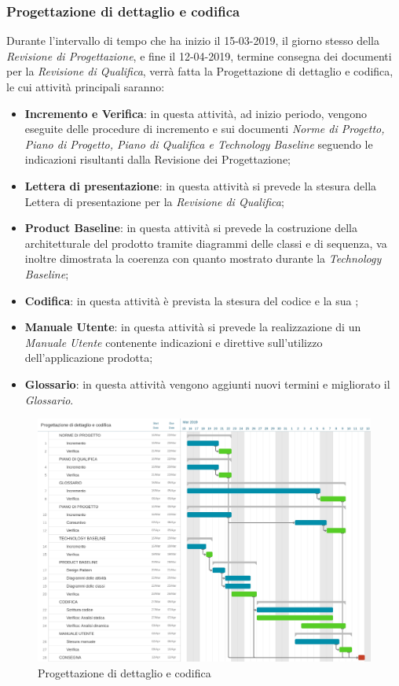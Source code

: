 \clearpage
\subsubsection{Progettazione di dettaglio e codifica}
Durante l'intervallo di tempo che ha inizio il 15-03-2019, il giorno stesso della \emph{Revisione di Progettazione}, e fine il 12-04-2019, termine consegna dei documenti per la \emph{Revisione di Qualifica}, verrà fatta la Progettazione di dettaglio e codifica, le cui attività principali saranno:
	\begin{itemize}
		\item \textbf{Incremento e Verifica}: in questa attività, ad inizio periodo, vengono eseguite delle procedure di incremento e  sui documenti \emph{Norme di Progetto, Piano di Progetto, Piano di Qualifica e Technology Baseline} seguendo le indicazioni risultanti dalla Revisione dei Progettazione;
		\item \textbf{Lettera di presentazione}: in questa attività si prevede la stesura della Lettera di presentazione per la \emph{Revisione di Qualifica};
		\item \textbf{Product Baseline}: in questa attività si prevede la costruzione della  architetturale del prodotto tramite diagrammi delle classi e di sequenza, va inoltre dimostrata la coerenza con quanto mostrato durante la \emph{Technology Baseline};
		\item \textbf{Codifica}: in questa attività è prevista la stesura del codice e la sua \emph{};
		\item \textbf{Manuale Utente}: in questa attività si prevede la realizzazione di un \emph{Manuale Utente} contenente indicazioni e direttive sull'utilizzo dell'applicazione prodotta;
		\item \textbf{Glossario}: in questa attività vengono aggiunti nuovi termini e migliorato il \emph{Glossario}.
	\end{itemize}
\begin{figure}[htbp]
	\centering
	\includegraphics[width=15cm,keepaspectratio]{../includes/pics/grafici/Gantt_progettazione_dettaglio_codifica.jpeg}
	\caption{\label{fig:mission} Progettazione di dettaglio e codifica}
\end{figure}

